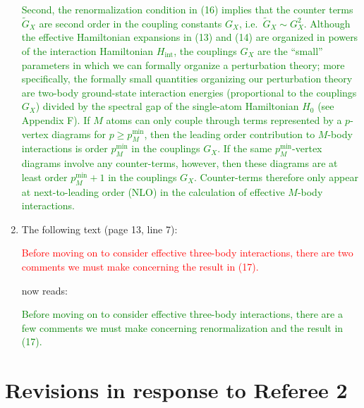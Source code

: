 \documentclass[preprint,showkeys,nofootinbib]{revtex4-1}
\renewcommand{\t}{\text} %
\newcommand{\1}{\mathds{1}}
\newcommand{\red}[1]{\textcolor{red}{#1}}
\newcommand{\green}[1]{\textcolor{green}{#1}}
\newcounter{point}
\begin{document}
\begin{enumerate}[label=(R1.\arabic{point}.\arabic*)]
  \green{Second, the renormalization condition in (16) implies that
    the counter terms $\tilde G_X$ are second order in the coupling
    constants $G_X$, i.e.~$\tilde G_X\sim G_X^2$.  Although the
    effective Hamiltonian expansions in (13) and (14) are organized in
    powers of the interaction Hamiltonian $H_{\t{int}}$, the couplings
    $G_X$ are the ``small'' parameters in which we can formally
    organize a perturbation theory; more specifically, the formally
    small quantities organizing our perturbation theory are two-body
    ground-state interaction energies (proportional to the couplings
    $G_X$) divided by the spectral gap of the single-atom Hamiltonian
    $H_0$ (see Appendix F).  If $M$ atoms can only couple through
    terms represented by a $p$-vertex diagrams for
    $p\ge p_M^{\t{min}}$, then the leading order contribution to
    $M$-body interactions is order $p_M^{\t{min}}$ in the couplings
    $G_X$.  If the same $p_M^{\t{min}}$-vertex diagrams involve any
    counter-terms, however, then these diagrams are at least order
    $p_M^{\t{min}}+1$ in the couplings $G_X$.  Counter-terms therefore
    only appear at next-to-leading order (NLO) in the calculation of
    effective $M$-body interactions.}


\item The following text (page 13, line 7):

  \red{Before moving on to consider effective three-body interactions,
    there are two comments we must make concerning the result in
    (17).}

  now reads:

  \green{Before moving on to consider effective three-body
    interactions, there are a few comments we must make concerning
    renormalization and the result in (17).}

\end{enumerate}


\section*{Revisions in response to Referee 2}
\end{document}
